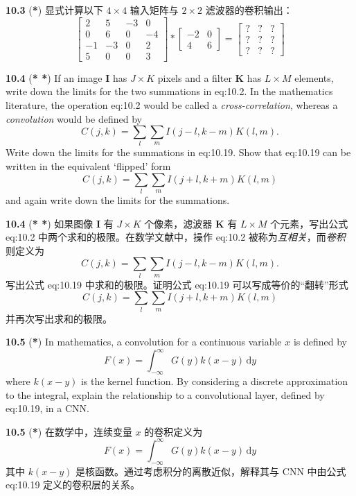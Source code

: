 \documentclass{article}
\begin{document}
\textbf{10.3} (\textbf{*}) 显式计算以下 $4 \times 4$ 输入矩阵与 $2 \times 2$ 滤波器的卷积输出：
\[
\begin{bmatrix}
2 & 5 & -3 & 0 \\
0 & 6 & 0 & -4 \\
-1 & -3 & 0 & 2 \\
5 & 0 & 0 & 3
\end{bmatrix}
*
\begin{bmatrix}
-2 & 0 \\
4 & 6
\end{bmatrix}
=
\begin{bmatrix}
? & ? & ? \\
? & ? & ? \\
? & ? & ?
\end{bmatrix}
\]

\textbf{10.4} (\textbf{* *}) If an image $\mathbf{I}$ has $J \times K$ pixels and a filter $\mathbf{K}$ has $L \times M$ elements, write down the limits for the two summations in {eq:10.2}. In the mathematics literature, the operation {eq:10.2} would be called a \emph{cross-correlation}, whereas a \emph{convolution} would be defined by
\[
C(j,k) = \sum_l \sum_m I(j-l, k-m)K(l,m).
\]
Write down the limits for the summations in {eq:10.19}. Show that {eq:10.19} can be written in the equivalent `flipped' form
\[
C(j,k) = \sum_l \sum_m I(j+l, k+m)K(l,m)
\]
and again write down the limits for the summations.

\textbf{10.4} (\textbf{* *}) 如果图像 $\mathbf{I}$ 有 $J \times K$ 个像素，滤波器 $\mathbf{K}$ 有 $L \times M$ 个元素，写出公式 {eq:10.2} 中两个求和的极限。在数学文献中，操作 {eq:10.2} 被称为\emph{互相关}，而\emph{卷积}则定义为
\[
C(j,k) = \sum_l \sum_m I(j-l, k-m)K(l,m).
\]
写出公式 {eq:10.19} 中求和的极限。证明公式 {eq:10.19} 可以写成等价的“翻转”形式
\[
C(j,k) = \sum_l \sum_m I(j+l, k+m)K(l,m)
\]
并再次写出求和的极限。

\textbf{10.5} (\textbf{*}) In mathematics, a convolution for a continuous variable $x$ is defined by
\[
F(x) = \int_{-\infty}^{\infty} G(y)k(x-y) \, \mathrm{d}y
\]
where $k(x-y)$ is the kernel function. By considering a discrete approximation to the integral, explain the relationship to a convolutional layer, defined by {eq:10.19}, in a CNN.

\textbf{10.5} (\textbf{*}) 在数学中，连续变量 $x$ 的卷积定义为
\[
F(x) = \int_{-\infty}^{\infty} G(y)k(x-y) \, \mathrm{d}y
\]
其中 $k(x-y)$ 是核函数。通过考虑积分的离散近似，解释其与 CNN 中由公式 {eq:10.19} 定义的卷积层的关系。
\end{document}
